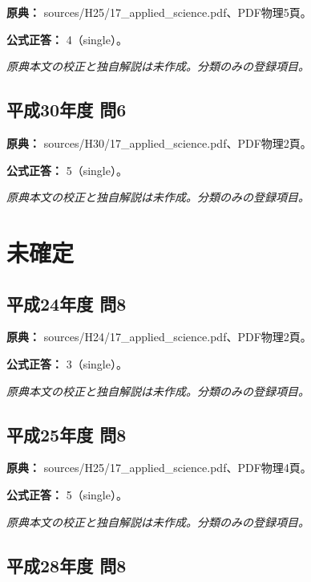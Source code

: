 \noindent\textbf{原典：} sources/H25/17\_applied\_science.pdf、PDF物理5頁。

\textbf{公式正答：} 4（single）。

\par\textit{原典本文の校正と独自解説は未作成。分類のみの登録項目。}

\subsection{平成30年度 問6}
\label{q:h30-reg-applied-06}

\noindent\textbf{原典：} sources/H30/17\_applied\_science.pdf、PDF物理2頁。

\textbf{公式正答：} 5（single）。

\par\textit{原典本文の校正と独自解説は未作成。分類のみの登録項目。}

\section{未確定}

\subsection{平成24年度 問8}
\label{q:h24-reg-applied-08}

\noindent\textbf{原典：} sources/H24/17\_applied\_science.pdf、PDF物理2頁。

\textbf{公式正答：} 3（single）。

\par\textit{原典本文の校正と独自解説は未作成。分類のみの登録項目。}

\subsection{平成25年度 問8}
\label{q:h25-reg-applied-08}

\noindent\textbf{原典：} sources/H25/17\_applied\_science.pdf、PDF物理4頁。

\textbf{公式正答：} 5（single）。

\par\textit{原典本文の校正と独自解説は未作成。分類のみの登録項目。}

\subsection{平成28年度 問8}
\label{q:h28-reg-applied-08}

